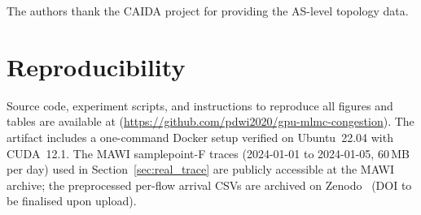\documentclass{ieeeaccess}
\begin{document}
The authors thank the CAIDA project for providing the AS-level topology data.

\section*{Reproducibility}
\label{sec:reproducibility}
Source code, experiment scripts, and instructions to reproduce all figures and tables are
available at \cite{gpu_mlmc_code} (\url{https://github.com/pdwi2020/gpu-mlmc-congestion}).
The artifact includes a one-command Docker setup verified on Ubuntu~22.04 with CUDA~12.1.
The MAWI samplepoint-F traces (2024-01-01 to 2024-01-05, 60\,MB per day) used in
Section~\ref{sec:real_trace} are publicly accessible at the MAWI archive; the
preprocessed per-flow arrival CSVs are archived on Zenodo~\cite{mawi2024zenodo}
(DOI to be finalised upon upload).


\EOD
\end{document}
